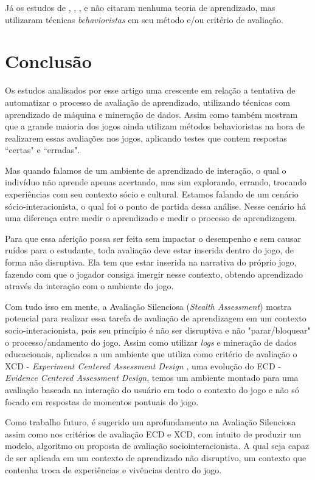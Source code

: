 \documentclass[12pt]{article}
\begin{document}
Já os estudos de \cite{kam2007localized}, \cite{kam2009improving}, \cite{del2010easing}, \cite{de20163d} e \cite{mota2017environment} não citaram nenhuma teoria de aprendizado, mas utilizaram técnicas \textit{behavioristas} em seu método e/ou critério de avaliação.

\section{Conclusão}\label{sec:conclusao}

Os estudos analisados por esse artigo uma crescente em relação a tentativa de automatizar o processo de avaliação de aprendizado, utilizando técnicas com aprendizado de máquina e mineração de dados. Assim como também mostram que a grande maioria dos jogos ainda utilizam métodos behavioristas na hora de realizarem essas avaliações nos jogos, aplicando testes que contem respostas ``certas" e ``erradas".

Mas quando falamos de um ambiente de aprendizado de interação, o qual o indivíduo não aprende apenas acertando, mas sim explorando, errando, trocando experiências com seu contexto sócio e cultural. Estamos falando de um cenário sócio-interacionista, o qual foi o ponto de partida dessa análise. Nesse cenário há uma diferença entre medir o aprendizado e medir o processo de aprendizagem.

Para que essa aferição possa ser feita sem impactar o desempenho e sem causar ruídos para o estudante, toda avaliação deve estar inserida dentro do jogo, de forma não disruptiva. Ela tem que estar inserida na narrativa do próprio jogo, fazendo com que o jogador consiga imergir nesse contexto, obtendo aprendizado através da interação com o ambiente do jogo.

Com tudo isso em mente, a Avaliação Silenciosa (\textit{Stealth Assessment}) mostra potencial para realizar essa tarefa de avaliação de aprendizagem em um contexto socio-interacionista, pois seu princípio é não ser disruptiva e não "parar/bloquear" o processo/andamento do jogo. Assim como utilizar \textit{logs} e mineração de dados educacionais, aplicados a um ambiente que utiliza como critério de avaliação o XCD - \textit{Experiment Centered Assessment Design} \cite{conrad2014framework}, uma evolução do ECD - \textit{Evidence Centered Assessment Design}, temos um ambiente montado para uma avaliação baseada na interação do usuário em todo o contexto do jogo e não só focado em respostas de momentos pontuais do jogo.

Como trabalho futuro, é sugerido um aprofundamento na Avaliação Silenciosa assim como nos critérios de avaliação ECD e XCD, com intuito de produzir um modelo, algoritmo ou proposta de avaliação sociointeracionista. A qual seja capaz de ser aplicada em um contexto de aprendizado não disruptivo, um contexto que contenha troca de experiências e vivências dentro do jogo.



\end{document}
